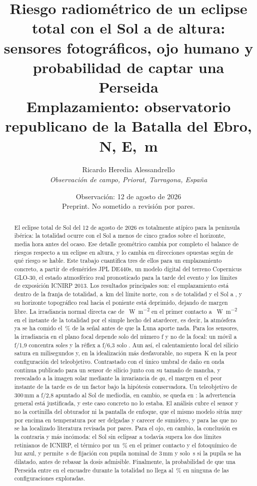 \documentclass[10pt,a4paper]{article}
\title{\bfseries Riesgo radiométrico de un eclipse total con el Sol a \altMax\textdegree{} de altura:\\
sensores fotográficos, ojo humano y probabilidad de captar una Perseida\\[2mm]
\large Emplazamiento: observatorio republicano de la Batalla del Ebro, \siteLat\textdegree{} N, \siteLon\textdegree{} E, \siteElevDEM\,m}
\author{%
  \large Ricardo Heredia Alessandrello\\[1mm]
  \normalsize\itshape Observación de campo, Priorat, Tarragona, España
}
\date{\normalsize Observación: 12 de agosto de 2026\\[1mm]
      \footnotesize Preprint. No sometido a revisión por pares.}
\begin{document}
\maketitle

\begin{abstract}
\noindent
El eclipse total de Sol del 12 de agosto de 2026 es totalmente atípico para la
península ibérica: la totalidad ocurre con el Sol a menos de cinco grados sobre
el horizonte, media hora antes del ocaso. Ese detalle geométrico cambia por
completo el balance de riesgos respecto a un eclipse en altura, y lo cambia en
direcciones opuestas según de qué riesgo se hable. Este trabajo cuantifica tres
de ellos para un emplazamiento concreto, a partir de efemérides JPL DE440s, un
modelo digital del terreno Copernicus GLO-30, el estado atmosférico real
pronosticado para la tarde del evento y los límites de exposición ICNIRP 2013.
Los resultados principales son: el emplazamiento está dentro de la franja de
totalidad, a \perpLimit\,km del límite norte, con \totalityDur\,s de totalidad y
el Sol a \altMax\textdegree{}, y su horizonte topográfico real hacia el poniente
está deprimido, dejando \clearance\textdegree{} de margen libre. La irradiancia normal directa cae de
\dniCOne~\si{\watt\per\square\meter} en el primer contacto a
\dniMaxNoEcl~\si{\watt\per\square\meter} en el instante de la totalidad por el
simple hecho del atardecer, es decir, la atmósfera ya se ha comido el
\sunsetDrop\,\% de la señal antes de que la Luna aporte nada. Para los sensores,
la irradiancia en el plano focal depende solo del número f y no de la focal:
un móvil a f/1{,}9 concentra \concFOneNine{} soles y la réflex a f/6{,}3 solo
\concFSixThree. Aun así, el calentamiento local del silicio satura en
milisegundos y, en la idealización más desfavorable, no supera
\dTworstThreeZeroZero\,K en la peor configuración del teleobjetivo. Contrastado
con el único umbral de daño en onda continua publicado para un sensor de silicio
junto con su tamaño de mancha, y reescalado a la imagen solar mediante la
invariancia de $qa$, el margen en el peor instante de la tarde es de un factor
\marginA{} bajo la hipótesis conservadora. Un teleobjetivo de 300\,mm a f/2,8
apuntado al Sol de mediodía, en cambio, se queda en \marginFast{}: la advertencia
general está justificada, y este caso concreto no lo estaba. El análisis cubre el
sensor y no la cortinilla del obturador ni la pantalla de enfoque, que el mismo
modelo sitúa muy por encima en temperatura por ser delgadas y carecer de
sumidero, y para las que no se ha localizado literatura revisada por pares. Para el ojo, en cambio, la conclusión es la contraria y más
incómoda: el Sol sin eclipsar a \altMax\textdegree{} todavía supera los dos
límites retinianos de ICNIRP, el térmico por un \thermExcessCOne\,\% en el primer
contacto y el fotoquímico de luz azul, y permite \stareNoEclMaxPThree\,s de fijación con
pupila nominal de 3\,mm y solo \stareNoEclMaxPSeven\,s si la pupila se ha
dilatado, antes de rebasar la dosis admisible. Finalmente, la probabilidad de que una
Perseida entre en el encuadre durante la totalidad no llega al
\pPerseidMax\,\% en ninguna de las configuraciones exploradas.
\end{abstract}
\end{document}
